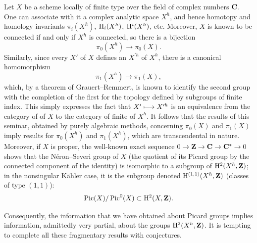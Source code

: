 Let $X$ be a scheme locally of
finite type over the field of complex numbers $\mathbf C$. One can associate
with it a complex analytic space $X^h$, and hence homotopy and homology
invariants $\pi_i(X^h)$, $\mathrm H_i(X^h)$, $\mathrm H^i(X^h)$, etc.
\sisi{\dotsc}{} Moreover, $X$ is known to be connected if and only if
$X^h$ is connected, so there is a bijection
$$
\pi_0(X^h)\to \pi_0(X).
$$
Similarly, since every  $X'$ of
$X$ defines an  $X^{\prime h}$ of
$X^h$\pageoriginale, there is a canonical homomorphism
$$
\pi_1(X^h)\to \pi_1(X),
$$
which, by a theorem of Grauert--Remmert, is known to identify the second
group with the completion of the first for the topology defined by
subgroups of finite index. This simply expresses the fact that
$X'\longmapsto X^{\prime h}$ is an equivalence from the
category of  of $X$ to the
category of finite  of $X^h$.
It follows that the results of this seminar, obtained by purely
algebraic methods, concerning $\pi_0(X)$ and $\pi_1(X)$ imply results
for $\pi_0(X^h)$ and $\pi_1(X^h)$, which are transcendental in nature.
Moreover, if $X$ is proper, the well-known exact sequence
$0\to\mathbf Z\to\mathbf C\to\mathbf C^*\to0$ shows that the N\'eron--Severi group of $X$
(the quotient of its Picard group by the connected component of the
identity) is isomorphic to a subgroup of $\mathrm H^2(X^h,\mathbf Z)$; in the
nonsingular K\"ahler case, it is the subgroup denoted
$\mathrm H^{(1,1)}(X^h,\mathbf Z)$ (classes of type $(1,1)$):
$$
\operatorname{Pic}(X)/\operatorname{Pic}^0(X)\subset \mathrm H^2(X,\mathbf Z).
$$

Consequently, the information that we have obtained about Picard groups
implies information, admittedly very partial, about the groups
$\mathrm H^2(X^h,\mathbf Z)$. It is tempting to complete all these fragmentary
results with conjectures.


